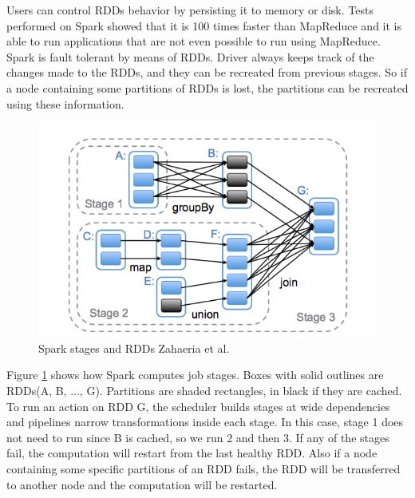 \documentclass[english]{tktltiki}
\begin{document}
Users can control RDDs behavior by persisting it to memory or disk. 
Tests performed on Spark showed that it is 100 times faster than MapReduce and it is able to run applications that are not even possible to run using MapReduce. 
Spark is fault tolerant by means of RDDs. 
Driver always keeps track of the changes made to the RDDs, and they can be recreated from previous stages. 
So if a node containing some partitions of RDDs is lost, the partitions can be recreated using these information. 
 
\begin{figure}[ht!]
\centering
\includegraphics[width=150mm]{figures/rdd.png}
\caption[]{Spark stages and RDDs  Zahaeria et al.\ \cite{zaharia12} }
\label{fig:rdd}
\end{figure}

Figure \ref{fig:rdd} shows how Spark computes job stages. 
Boxes with solid outlines are RDDs(A, B, ..., G). 
Partitions are shaded rectangles, in black if they are cached. 
To run an action on RDD G, the scheduler builds stages at wide dependencies and pipelines narrow transformations inside each stage. 
In this case, stage 1 does not need to run since B is cached, so we run 2 and then 3. 
If any of the stages fail, the computation will restart from the last healthy RDD. 
Also if a node containing some specific partitions of an RDD fails, the RDD will be transferred to another node and the computation will be restarted. 

\newpage
\end{document}

